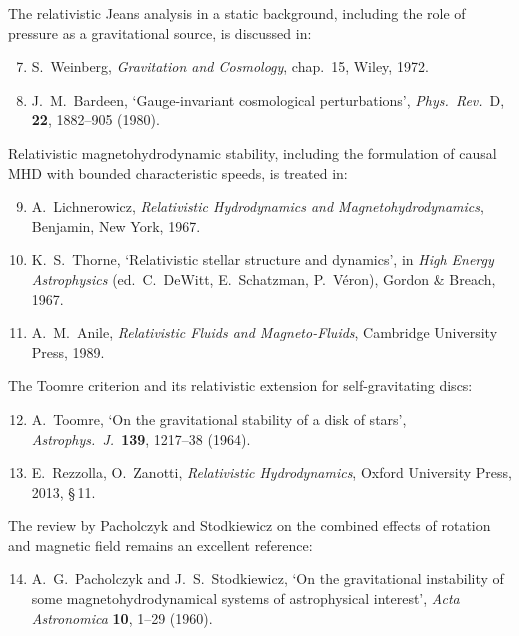 \noindent
The relativistic Jeans analysis in a static background, including the
role of pressure as a gravitational source, is discussed in:

\begin{enumerate}
\setcounter{enumi}{6}
\item S.~Weinberg, \textit{Gravitation and Cosmology}, chap.~15,
  Wiley, 1972.
\item J.~M.~Bardeen, `Gauge-invariant cosmological perturbations',
  \textit{Phys.\ Rev.}~D, \textbf{22}, 1882--905 (1980).
\end{enumerate}

\noindent
Relativistic magnetohydrodynamic stability, including the formulation of
causal MHD with bounded characteristic speeds, is treated in:

\begin{enumerate}
\setcounter{enumi}{8}
\item A.~Lichnerowicz, \textit{Relativistic Hydrodynamics and
  Magnetohydrodynamics}, Benjamin, New York, 1967.
\item K.~S.~Thorne, `Relativistic stellar structure and dynamics',
  in \textit{High Energy Astrophysics} (ed.\ C.~DeWitt, E.~Schatzman,
  P.~V\'eron), Gordon \& Breach, 1967.
\item A.~M.~Anile, \textit{Relativistic Fluids and Magneto-Fluids},
  Cambridge University Press, 1989.
\end{enumerate}

\noindent
The Toomre criterion and its relativistic extension for self-gravitating
discs:

\begin{enumerate}
\setcounter{enumi}{11}
\item A.~Toomre, `On the gravitational stability of a disk of stars',
  \textit{Astrophys.\ J.}\ \textbf{139}, 1217--38 (1964).
\item E.~Rezzolla, O.~Zanotti, \textit{Relativistic Hydrodynamics},
  Oxford University Press, 2013, \S\,11.
\end{enumerate}

\noindent
The review by Pacholczyk and Stodkiewicz on the combined effects of
rotation and magnetic field remains an excellent reference:

\begin{enumerate}
\setcounter{enumi}{13}
\item A.~G.~Pacholczyk and J.~S.~Stodkiewicz, `On the gravitational
  instability of some magnetohydrodynamical systems of astrophysical
  interest', \textit{Acta Astronomica} \textbf{10}, 1--29 (1960).
\end{enumerate}

